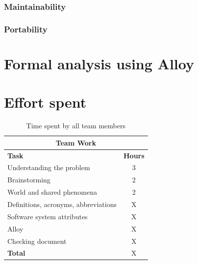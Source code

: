 \documentclass[12pt]{article}
\begin{document}
\subsubsection{Maintainability}
\subsubsection{Portability}

\section{Formal analysis using Alloy}

\section{Effort spent}
\begin{table}[h]
\centering 
\begin{tabular}{l c} 
\hline\hline 
\multicolumn{2}{c}{\textbf{Team Work}} \\ 
\hline
\textbf{Task} & \textbf{Hours} \\ [0.5ex] 
\hline 
Understanding the problem & 3  \\
Brainstorming & 2 \\
World and shared phenomena & 2 \\
Definitions, acronyms, abbreviations & X  \\
Software system attributes & X \\ 
Alloy & X \\
Checking document  & X  \\
\hline
\textbf{Total} & X  \\
\hline 
\end{tabular}
\caption{Time spent by all team members}
\label{fig:Time spent by all team members}
\end{table}
\end{document}
